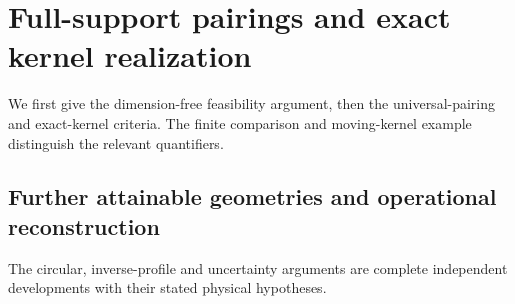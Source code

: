 \documentclass[11pt]{amsart}
\theoremstyle{definition}\newtheorem{definition}[theorem]{Definition}
\theoremstyle{remark}\newtheorem{remark}[theorem]{Remark}
\begin{document}
\section{Full-support pairings and exact kernel realization}
\label{app:pairings}
We first give the dimension-free feasibility argument, then the
universal-pairing and exact-kernel criteria. The finite comparison and
moving-kernel example distinguish the relevant quantifiers.
\begingroup
\let\section\subsection
\let\subsection\subsubsection
\let\subsubsection\paragraph







\endgroup
\section{Further attainable geometries and operational reconstruction}
\label{app:additional-geometry}
The circular, inverse-profile and uncertainty arguments are complete
independent developments with their stated physical hypotheses.
\begingroup
\let\section\subsection
\let\subsection\subsubsection
\let\subsubsection\paragraph




\endgroup
\end{document}
